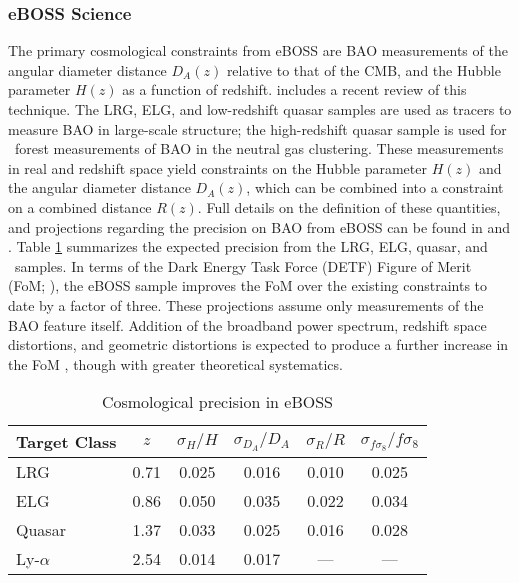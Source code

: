 \subsubsection{eBOSS Science}
\label{sec:eboss:science}

The primary cosmological constraints from eBOSS are BAO measurements
of the angular diameter distance $D_A(z)$ relative to that of the CMB,
and the Hubble parameter $H(z)$ as a function of
redshift. \citet{weinberg13a} includes a recent review of this
technique. The LRG, ELG, and low-redshift quasar samples are used as
tracers to measure BAO in large-scale structure; the high-redshift
quasar sample is used for \lya\ forest measurements of BAO in the
neutral gas clustering. These measurements in real and redshift space
yield constraints on the Hubble parameter $H(z)$ and the angular
diameter distance $D_A(z)$, which can be combined into a constraint on
a combined distance $R(z)$. Full details on the definition of these
quantities, and projections regarding the precision on BAO from eBOSS
can be found in \citet{dawson16a} and \citet{zhao16a}.
Table \ref{table:eboss_samples} summarizes the expected precision from
the LRG, ELG, quasar, and \lya\ samples.  In terms of the Dark Energy
Task Force (DETF) Figure of Merit (FoM; \citealt{albrecht06a}), the
eBOSS sample improves the FoM over the existing constraints to date by
a factor of three. These projections assume only measurements of the
BAO feature itself. Addition of the broadband power spectrum, redshift
space distortions, and geometric distortions is expected to produce a
further increase in the FoM \citep{mcdonald09a}, though with greater
theoretical systematics.

\begin{table}[t!]
\caption{
\label{table:eboss_samples} Cosmological precision in eBOSS}
\begin{tabular}{lccccc}
\hline\hline
Target Class & $z$ & $\sigma_H/H$ & $\sigma_{D_A}/D_A$
& $\sigma_R/R$ & $\sigma_{f\sigma_8}/f\sigma_8$\tablenotemark{a}\\
\hline
LRG\tablenotemark{b} & 0.71 & 0.025 & 0.016 & 0.010 & 0.025 \\
ELG\tablenotemark{c} & 0.86 & 0.050 & 0.035 & 0.022 & 0.034 \\
Quasar & 1.37 & 0.033 & 0.025 & 0.016 & 0.028 \\
Ly-$\alpha$ & 2.54 & 0.014 & 0.017 & --- & --- \\
\hline
\end{tabular}
\end{table}

